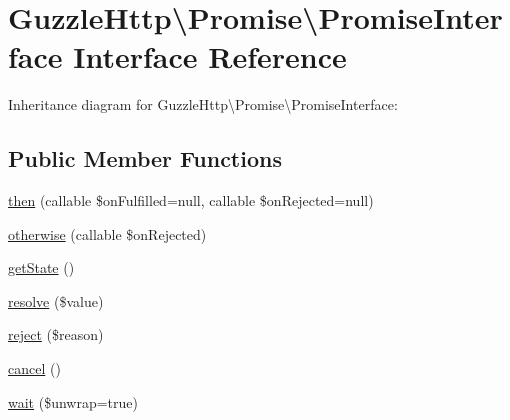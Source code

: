 \hypertarget{interfaceGuzzleHttp_1_1Promise_1_1PromiseInterface}{}\section{Guzzle\+Http\textbackslash{}Promise\textbackslash{}Promise\+Interface Interface Reference}
\label{interfaceGuzzleHttp_1_1Promise_1_1PromiseInterface}


Inheritance diagram for Guzzle\+Http\textbackslash{}Promise\textbackslash{}Promise\+Interface\+:
\subsection*{Public Member Functions}
\begin{DoxyCompactItemize}
\item 
\hyperlink{interfaceGuzzleHttp_1_1Promise_1_1PromiseInterface_a2f1174c4a67f1b7fb1a74d37466bc90a}{then} (callable \$on\+Fulfilled=null, callable \$on\+Rejected=null)
\item 
\hyperlink{interfaceGuzzleHttp_1_1Promise_1_1PromiseInterface_a4a7334842850943b3dd2fdd8ec23943b}{otherwise} (callable \$on\+Rejected)
\item 
\hyperlink{interfaceGuzzleHttp_1_1Promise_1_1PromiseInterface_a4473485faedc0b6489ff28b4fbdc2330}{get\+State} ()
\item 
\hyperlink{interfaceGuzzleHttp_1_1Promise_1_1PromiseInterface_ae39a5f1a81903f74af5114c272bf7b7b}{resolve} (\$value)
\item 
\hyperlink{interfaceGuzzleHttp_1_1Promise_1_1PromiseInterface_a6c34789baeca75bd8c4fb4acf4999f78}{reject} (\$reason)
\item 
\hyperlink{interfaceGuzzleHttp_1_1Promise_1_1PromiseInterface_ab3f2eb63d775492446ab3784618aeef8}{cancel} ()
\item 
\hyperlink{interfaceGuzzleHttp_1_1Promise_1_1PromiseInterface_ad7f8dc7f9513af40c61a985ad89b6219}{wait} (\$unwrap=true)
\end{DoxyCompactItemize}
